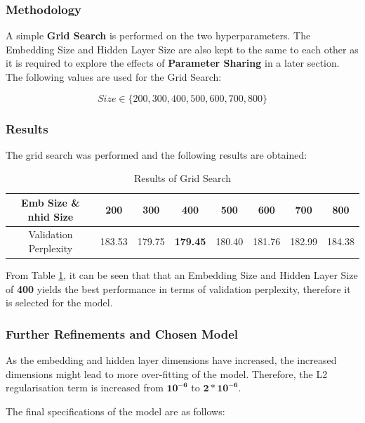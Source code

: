 \documentclass[sigconf,nonacm=true]{acmart}
\begin{document}
\subsubsection{Methodology}
A simple \textbf{Grid Search} is performed on the two hyperparameters. The Embedding Size and Hidden Layer Size are also kept to the same to each other as it is required to explore the effects of \textbf{Parameter Sharing} in a later section. The following values are used for the Grid Search:

\begin{displaymath}
Size \in \{200, 300, 400, 500, 600, 700, 800\}
\end{displaymath}
\subsubsection{Results} 
The grid search was performed and the following results are obtained:
\begin{table}[h]
\label{tab:gridsearch}
	\begin{adjustbox}{width=\columnwidth}
		\begin{tabular}{cccccccc}
			\toprule
			Emb Size \& nhid Size & 200 & 300 & \textbf{400} & 500 & 600 & 700 & 800 \\
			\midrule
			Validation Perplexity& 183.53 & 179.75 & \textbf{179.45} & 180.40 & 181.76 & 182.99 & 184.38 \\
			\bottomrule
		\end{tabular}
	\end{adjustbox}

	\caption{Results of Grid Search}
\end{table}

From Table \ref{tab:gridsearch}, it can be seen that that an Embedding Size and Hidden Layer Size of \textbf{400} yields the best performance in terms of validation perplexity, therefore it is selected for the model.


\subsubsection{Further Refinements and Chosen Model}
\label{subsubsection:chosenmodel}
As the embedding and hidden layer dimensions have increased, the increased dimensions might lead to more over-fitting of the model. Therefore, the L2 regularisation term is increased from \(\mathbf{10^{-6}}\) to \(\mathbf{2 * 10^{-6}}\). 

The final specifications of the model are as follows:
\end{document}
